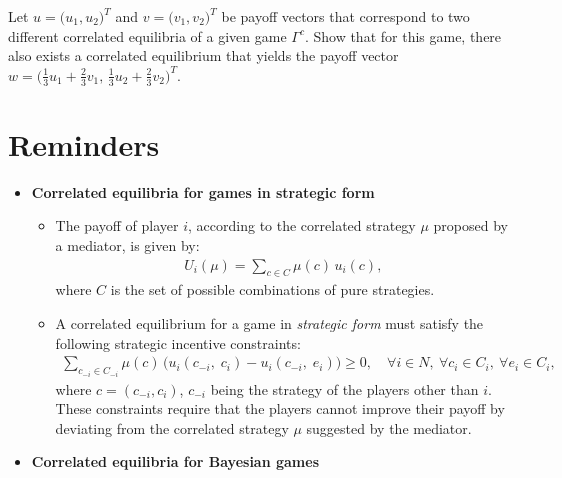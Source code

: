 \documentclass{../ape}
\begin{document}
\begin{solution}

\end{solution}

\thex{}
Let $u = \big( u_1, u_2 \big)^T$ and $v = \big( v_1, v_2 \big)^T$ be payoff vectors that correspond to two different correlated equilibria of a given game $\Gamma^c$. Show that for this game, there also exists a correlated equilibrium that yields the payoff vector $w = \big( \frac{1}{3} u_1 + \frac{2}{3} v_1, \, \frac{1}{3} u_2 + \frac{2}{3} v_2 \big)^T$. 

\newpage

\section*{Reminders}

\begin{itemize}[leftmargin=*]
\renewcommand{\labelitemi}{$\bullet$}

	\item \textbf{Correlated equilibria for games in strategic form}
	\vspace{.3cm}

	\begin{itemize}

		\item The payoff of player $i$, according to the correlated strategy $\mu$ proposed by a mediator, is given by:
		\begin{align*}
			U_i(\mu) = \sum_{c \in C} \mu(c) \, u_i(c),
		\end{align*}
		where $C$ is the set of possible combinations of pure strategies.
			
		\item A correlated equilibrium for a game in \emph{strategic form} must satisfy the following strategic incentive constraints:
		\begin{align*}
			\sum_{c_{-i} \in C_{-i}} \mu(c) \, \big( u_i(c_{-i}, \; c_i) - u_i(c_{-i}, \; e_i) \big) \geq 0, \quad \forall i \in N, \ \forall c_i \in C_i, \ \forall e_i \in C_i,
		\end{align*}
		where $c = (c_{-i}, c_i)$, $c_{-i}$ being the strategy of the players other than $i$. These constraints require that the players cannot improve their payoff by deviating from the correlated strategy $\mu$ suggested by the mediator.
			
	\end{itemize}
	\vspace{.3cm}

	\item \textbf{Correlated equilibria for Bayesian games}
	\vspace{.3cm}


\end{itemize}
\end{document}

